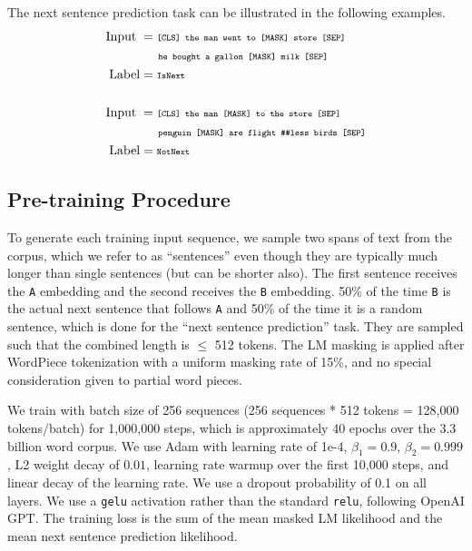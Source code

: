 The next sentence prediction task can be illustrated in the following examples.
\begin{align*}
\text{Input\;} &= \text{\tt {\scriptsize [CLS] the man went to [MASK] store [SEP]}} \\ 
& \text{\tt {\scriptsize \;\;\;\;\;\;\;he bought a gallon [MASK] milk [SEP]}}\\
\text{Label} &= \text{\tt {\scriptsize IsNext}} \\
\\
\text{Input\;} &= \text{\tt {\scriptsize [CLS] the man [MASK] to the store [SEP]}}\\
&\text{\tt {\scriptsize \;\;\;\;\;\;\;penguin [MASK] are flight \#\#less birds [SEP]}}\\
\text{Label} &= \text{\tt {\scriptsize NotNext}}
\end{align*}

\subsection{Pre-training Procedure}
\label{sec:pretraining_procedure}

To generate each training input sequence, we sample two spans of text from the corpus, which we refer to as ``sentences'' even though they are typically much longer than single sentences (but can be shorter also). The first sentence receives the {\tt A} embedding and the second receives the {\tt B} embedding. 50\% of the time {\tt B} is the actual next sentence that follows {\tt A} and 50\% of the time it is a random sentence, which is done for the ``next sentence prediction'' task. They are sampled such that the combined length is $\le$ 512 tokens. The LM masking is applied after WordPiece tokenization with a uniform masking rate of 15\%, and no special consideration given to partial word pieces.

We train with batch size of 256 sequences (256 sequences * 512 tokens = 128,000 tokens/batch) for 1,000,000 steps, which is approximately 40 epochs over the 3.3 billion word corpus. We use Adam with learning rate of 1e-4, ${\beta}_1=0.9$, ${\beta}_2=0.999$, L2 weight decay of $0.01$, learning rate warmup over the first 10,000 steps, and linear decay of the learning rate. We use a dropout probability of 0.1 on all layers. We use a {\tt gelu} activation \cite{hendrycks:2016} rather than the standard {\tt relu}, following OpenAI GPT. The training loss is the sum of the mean masked LM likelihood and the mean next sentence prediction likelihood.

